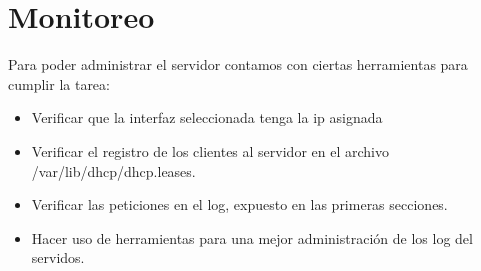 \section{Monitoreo}
Para poder administrar el servidor contamos con ciertas herramientas para cumplir la tarea:

\begin{itemize}
	\item Verificar que la interfaz seleccionada tenga la ip asignada
 	\item Verificar el registro de los clientes al servidor en el archivo /var/lib/dhcp/dhcp.leases.
 	\item Verificar las peticiones en el log, expuesto en las primeras secciones.
 	\item Hacer uso de herramientas para una mejor administración de los log del servidos.
\end{itemize}

